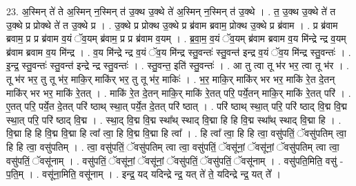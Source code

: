 \documentclass[17pt]{extarticle}
\begin{document}
23. अ॒स्मिन् ते॑ ते अ॒स्मिन् न॒स्मिन् त॑ उ॒क्थ उ॒क्थे ते॑ अ॒स्मिन् न॒स्मिन् त॑ उ॒क्थे । . त॒ उ॒क्थ उ॒क्थे ते॑ त उ॒क्थे प्र प्रोक्थे ते॑ त उ॒क्थे प्र । . उ॒क्थे प्र प्रोक्थ उ॒क्थे प्र ब्र॑वाम ब्रवाम॒ प्रोक्थ उ॒क्थे प्र ब्र॑वाम । . प्र ब्र॑वाम ब्रवाम॒ प्र प्र ब्र॑वाम व॒यं ॅव॒यम् ब्र॑वाम॒ प्र प्र ब्र॑वाम व॒यम् । . ब्र॒वा॒म॒ व॒यं ॅव॒यम् ब्र॑वाम ब्रवाम व॒य मि॑न्द्रे न्द्र व॒यम् ब्र॑वाम ब्रवाम व॒य मि॑न्द्र । . व॒य मि॑न्द्रे न्द्र व॒यं ॅव॒य मि॑न्द्र स्तु॒वन्तः॑ स्तु॒वन्त॑ इन्द्र व॒यं ॅव॒य मि॑न्द्र स्तु॒वन्तः॑ । . इ॒न्द्र॒ स्तु॒वन्तः॑ स्तु॒वन्त॑ इन्द्रे न्द्र स्तु॒वन्तः॑ । . स्तु॒वन्त॒ इति॑ स्तु॒वन्तः॑ । . आ तु त्वा तू भ॑र भर॒ त्वा तू भ॑र । . तू भ॑र भर॒ तु तू भ॑र॒ माकि॒र् माकि॑र् भर॒ तु तू भ॑र॒ माकिः॑ । . भ॒र॒ माकि॒र् माकि॑र् भर भर॒ माकि॑ रे॒त दे॒तन् माकि॑र् भर भर॒ माकि॑ रे॒तत् । . माकि॑ रे॒त दे॒तन् माकि॒र् माकि॑ रे॒तत् परि॒ पर्ये॒तन् माकि॒र् माकि॑ रे॒तत् परि॑ । . ए॒तत् परि॒ पर्ये॒त दे॒तत् परि॑ ष्ठाथ् स्था॒त् पर्ये॒त दे॒तत् परि॑ ष्ठात् । . परि॑ ष्ठाथ् स्था॒त् परि॒ परि॑ ष्ठाद् वि॒द्म वि॒द्म स्था॒त् परि॒ परि॑ ष्ठाद् वि॒द्म । . स्था॒द् वि॒द्म वि॒द्म स्था᳚थ् स्थाद् वि॒द्मा हि हि वि॒द्म स्था᳚थ् स्थाद् वि॒द्मा हि । . वि॒द्मा हि हि वि॒द्म वि॒द्मा हि त्वा᳚ त्वा॒ हि वि॒द्म वि॒द्मा हि त्वा᳚ । . हि त्वा᳚ त्वा॒ हि हि त्वा॒ वसु॑पतिं॒ ॅवसु॑पतिम् त्वा॒ हि हि त्वा॒ वसु॑पतिम् । . त्वा॒ वसु॑पतिं॒ ॅवसु॑पतिम् त्वा त्वा॒ वसु॑पतिं॒ ॅवसू॑नां॒ ॅवसू॑नां॒ ॅवसु॑पतिम् त्वा त्वा॒ वसु॑पतिं॒ ॅवसू॑नाम् । . वसु॑पतिं॒ ॅवसू॑नां॒ ॅवसू॑नां॒ ॅवसु॑पतिं॒ ॅवसु॑पतिं॒ ॅवसू॑नाम् । . वसु॑पति॒मिति॒ वसु॑ - प॒ति॒म् । . वसू॑ना॒मिति॒ वसू॑नाम् । . इन्द्र॒ यद् यदिन्द्रे न्द्र॒ यत् ते॑ ते॒ यदिन्द्रे न्द्र॒ यत् ते᳚ । \newline
\end{document}
